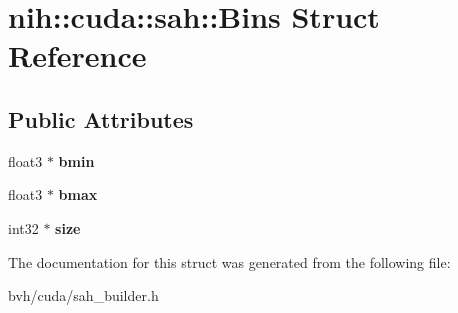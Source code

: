 \hypertarget{structnih_1_1cuda_1_1sah_1_1_bins}{
\section{nih\-:\-:cuda\-:\-:sah\-:\-:\-Bins \-Struct \-Reference}
\label{structnih_1_1cuda_1_1sah_1_1_bins}
}
\subsection*{\-Public \-Attributes}
\begin{DoxyCompactItemize}
\item 
\hypertarget{structnih_1_1cuda_1_1sah_1_1_bins_a1d6393400801094d517a421c31cdefc3}{
float3 $\ast$ {\bfseries bmin}}
\label{structnih_1_1cuda_1_1sah_1_1_bins_a1d6393400801094d517a421c31cdefc3}

\item 
\hypertarget{structnih_1_1cuda_1_1sah_1_1_bins_a8aefd1cf7d81965ca5ac1d31dd8c07c2}{
float3 $\ast$ {\bfseries bmax}}
\label{structnih_1_1cuda_1_1sah_1_1_bins_a8aefd1cf7d81965ca5ac1d31dd8c07c2}

\item 
\hypertarget{structnih_1_1cuda_1_1sah_1_1_bins_aac1f8944e8692600f9fe1e164061f6e3}{
int32 $\ast$ {\bfseries size}}
\label{structnih_1_1cuda_1_1sah_1_1_bins_aac1f8944e8692600f9fe1e164061f6e3}

\end{DoxyCompactItemize}


\-The documentation for this struct was generated from the following file\-:\begin{DoxyCompactItemize}
\item 
bvh/cuda/sah\-\_\-builder.\-h\end{DoxyCompactItemize}

